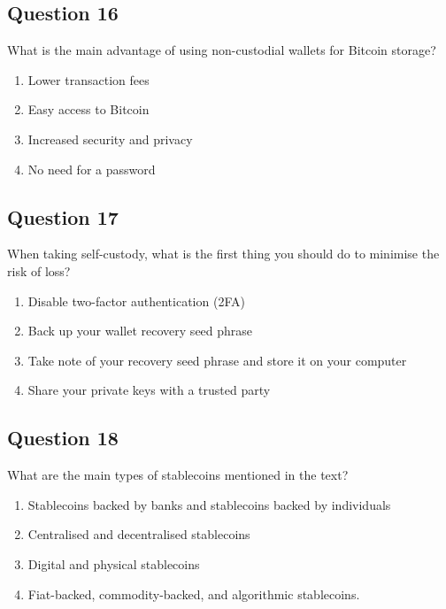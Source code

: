\documentclass[12pt,a4paper]{article}
\begin{document}
\bigskip


\subsection*{Question 16}
What is the main advantage of using non-custodial wallets for Bitcoin storage?

\begin{enumerate}[label=\Alph*., leftmargin=*]
\item Lower transaction fees
\item Easy access to Bitcoin
\item Increased security and privacy
\item No need for a password
\end{enumerate}

\bigskip


\subsection*{Question 17}
When taking self-custody, what is the first thing you should do to minimise the risk of loss?

\begin{enumerate}[label=\Alph*., leftmargin=*]
\item Disable two-factor authentication (2FA)
\item Back up your wallet recovery seed phrase
\item Take note of your recovery seed phrase and store it on your computer
\item Share your private keys with a trusted party
\end{enumerate}

\bigskip


\subsection*{Question 18}
What are the main types of stablecoins mentioned in the text?

\begin{enumerate}[label=\Alph*., leftmargin=*]
\item Stablecoins backed by banks and stablecoins backed by individuals
\item Centralised and decentralised stablecoins
\item Digital and physical stablecoins
\item Fiat-backed, commodity-backed, and algorithmic stablecoins.
\end{enumerate}
\end{document}
